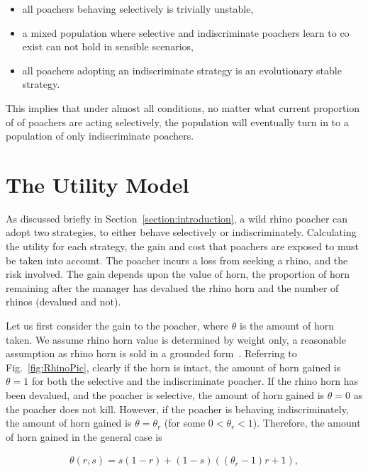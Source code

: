 \documentclass[10pt]{article}
\begin{document}
\begin{itemize}
    \item all poachers behaving selectively is trivially unstable,  
    \item a mixed population where selective and indiscriminate poachers
          learn to co exist can not hold in sensible scenarios,
    \item all poachers adopting an indiscriminate strategy is an evolutionary 
          stable strategy.
\end{itemize}

This implies that under almost all conditions, no matter what current proportion 
of
of poachers are acting selectively, the population will eventually turn in to a 
population of only indiscriminate poachers.

\section{The Utility Model}\label{section:the_model}

As discussed briefly in Section~\ref{section:introduction}, a wild rhino poacher
can adopt two strategies, to either behave selectively
or indiscriminately. Calculating the utility for each strategy, the gain and cost
that poachers are exposed to must be taken into account. The poacher incurs a
loss from seeking a rhino, and the risk involved. The gain depends upon the value
of horn, the proportion of horn remaining after the manager has devalued the 
rhino horn and the number of rhinos (devalued and not).

Let us first consider the gain to the poacher, where \(\theta\) is the amount of 
horn taken. We assume rhino horn value is determined by weight only, a 
reasonable assumption as rhino horn is sold in a grounded form~\cite{Saverhino}.
Referring to Fig.~\ref{fig:RhinoPic}, clearly if the horn is intact, the amount of
horn gained is \(\theta=1\) for both the selective and the indiscriminate poacher.
If the rhino horn has been devalued, and the poacher is selective, the amount of horn 
gained is \(\theta=0\) as the poacher does not kill. However, if the poacher is 
behaving indiscriminately, the amount of horn gained is \(\theta = \theta_r\)
(for some \(0<\theta_r<1\)). 
Therefore, the amount of horn gained in the general case is

\begin{eqnarray}
    \label{eqn:theta}
    \theta(r, s) = s (1 - r) + (1 - s) ((\theta_r - 1) r + 1),
\end{eqnarray}
\end{document}
